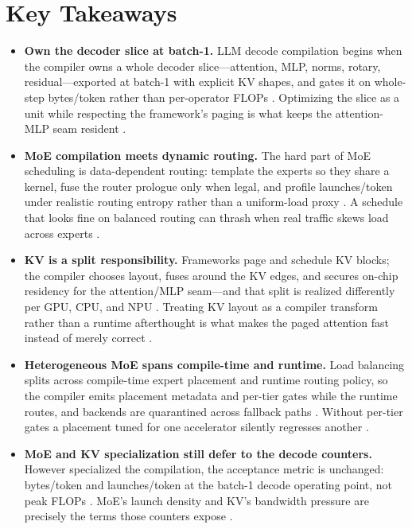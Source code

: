 \section{Key Takeaways}
\label{sec:ch23_key_takeaways}

\begin{itemize}
\item \textbf{Own the decoder slice at batch-1.}
LLM decode compilation begins when the compiler owns a whole decoder slice---attention, MLP, norms, rotary, residual---exported at batch-1 with explicit KV shapes, and gates it on whole-step bytes/token rather than per-operator FLOPs \citep{kwon2023vllm,patel2025llminference}. Optimizing the slice as a unit while respecting the framework's paging is what keeps the attention-MLP seam resident \citep{dao2022flashattention,memoryfloor2026}.

\item \textbf{MoE compilation meets dynamic routing.}
The hard part of MoE scheduling is data-dependent routing: template the experts so they share a kernel, fuse the router prologue only when legal, and profile launches/token under realistic routing entropy rather than a uniform-load proxy \citep{liu2024deepseekv3,taxbreak2026}. A schedule that looks fine on balanced routing can thrash when real traffic skews load across experts \citep{patel2025llminference,kwon2023vllm}.

\item \textbf{KV is a split responsibility.}
Frameworks page and schedule KV blocks; the compiler chooses layout, fuses around the KV edges, and secures on-chip residency for the attention/MLP seam---and that split is realized differently per GPU, CPU, and NPU \citep{kwon2023vllm,amd2024xdna}. Treating KV layout as a compiler transform rather than a runtime afterthought is what makes the paged attention fast instead of merely correct \citep{dao2022flashattention,semianalysis2024tma}.

\item \textbf{Heterogeneous MoE spans compile-time and runtime.}
Load balancing splits across compile-time expert placement and runtime routing policy, so the compiler emits placement metadata and per-tier gates while the runtime routes, and backends are quarantined across fallback paths \citep{liu2024deepseekv3,patel2025llminference}. Without per-tier gates a placement tuned for one accelerator silently regresses another \citep{yirage2026,amd2024aie}.

\item \textbf{MoE and KV specialization still defer to the decode counters.}
However specialized the compilation, the acceptance metric is unchanged: bytes/token and launches/token at the batch-1 decode operating point, not peak FLOPs \citep{patel2025llminference,taxbreak2026}. MoE's launch density and KV's bandwidth pressure are precisely the terms those counters expose \citep{memoryfloor2026,dlbook}.
\end{itemize}

